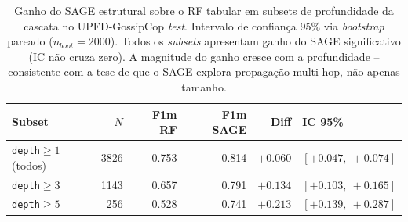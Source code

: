 \begin{table}[H]\centering
\caption{Ganho do SAGE estrutural sobre o RF tabular em subsets de profundidade da cascata no UPFD-GossipCop \emph{test}. Intervalo de confian\c{c}a 95\% via \emph{bootstrap} pareado ($n_{boot}=2000$). Todos os \emph{subsets} apresentam ganho do SAGE significativo (IC n\~ao cruza zero). A magnitude do ganho cresce com a profundidade -- consistente com a tese de que o SAGE explora propaga\c{c}\~ao multi-hop, n\~ao apenas tamanho.}
\label{tab:gap_profundidade}
\small
\begin{tabular}{lrrrrl}
\toprule
\textbf{Subset} & $N$ & \textbf{F1m RF} & \textbf{F1m SAGE} & \textbf{Diff} & \textbf{IC 95\%} \\
\midrule
\texttt{depth}$\geq 1$ (todos)  & 3826 & 0.753 & 0.814 & $+0.060$ & $[+0.047,\ +0.074]$ \\
\texttt{depth}$\geq 3$           & 1143 & 0.657 & 0.791 & $+0.134$ & $[+0.103,\ +0.165]$ \\
\texttt{depth}$\geq 5$           &  256 & 0.528 & 0.741 & $+0.213$ & $[+0.139,\ +0.287]$ \\
\bottomrule
\end{tabular}
\end{table}

